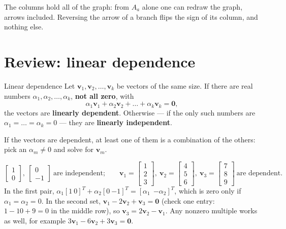 \documentclass[11pt,a4paper]{article}
\begin{document}
The columns hold all of the graph: from $A_a$ alone one can redraw the graph, arrows
included. Reversing the arrow of a branch flips the sign of its column, and nothing else.

\section{Review: linear dependence}

\begin{definitionbox}{Linear dependence}
Let $\mathbf{v}_1, \mathbf{v}_2, \dots, \mathbf{v}_k$ be vectors of the same size. If there
are real numbers $\alpha_1, \alpha_2, \dots, \alpha_k$, \textbf{not all zero}, with
\[
  \alpha_1\mathbf{v}_1 + \alpha_2\mathbf{v}_2 + \dots + \alpha_k\mathbf{v}_k = \mathbf{0},
\]
the vectors are \textbf{linearly dependent}. Otherwise --- if the only such numbers are
$\alpha_1 = \dots = \alpha_k = 0$ --- they are \textbf{linearly independent}.
\end{definitionbox}

If the vectors are dependent, at least one of them is a combination of the others: pick
an $\alpha_m \neq 0$ and solve for $\mathbf{v}_m$.

\begin{examplebox}
\[
  \begin{bmatrix} 1\\ 0 \end{bmatrix},\ \begin{bmatrix} 0\\ -1 \end{bmatrix}
  \ \text{are independent;}
  \qquad
  \mathbf{v}_1 = \begin{bmatrix} 1\\ 2\\ 3 \end{bmatrix},\
  \mathbf{v}_2 = \begin{bmatrix} 4\\ 5\\ 6 \end{bmatrix},\
  \mathbf{v}_3 = \begin{bmatrix} 7\\ 8\\ 9 \end{bmatrix}
  \ \text{are dependent.}
\]
In the first pair, $\alpha_1 [1\ 0]^T + \alpha_2 [0\ {-1}]^T = [\alpha_1\ \ {-\alpha_2}]^T$, which
is zero only if $\alpha_1 = \alpha_2 = 0$. In the second set, $\mathbf{v}_1 - 2\mathbf{v}_2 +
\mathbf{v}_3 = \mathbf{0}$ (check one entry: $1 - 10 + 9 = 0$ in the middle row), so
$\mathbf{v}_3 = 2\mathbf{v}_2 - \mathbf{v}_1$. Any nonzero multiple works as well, for
example $3\mathbf{v}_1 - 6\mathbf{v}_2 + 3\mathbf{v}_3 = \mathbf{0}$.
\end{examplebox}
\end{document}
